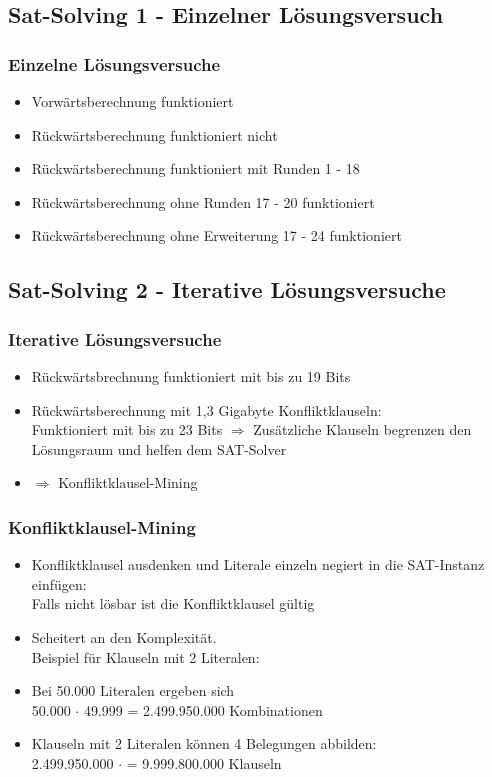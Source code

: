 \documentclass{beamer}
\begin{document}
  \subsection{Sat-Solving 1 - Einzelner Lösungsversuch}
    \begin{frame}
      \frametitle{Einzelne Lösungsversuche}
      \begin{itemize}
        \setlength{\itemsep}{20pt}
        \item Vorwärtsberechnung funktioniert
        \pause
        \item Rückwärtsberechnung funktioniert nicht
        \pause
        \item Rückwärtsberechnung funktioniert mit Runden 1 - 18
        \pause
        \item Rückwärtsberechnung ohne Runden 17 - 20 funktioniert
        \pause
        \item Rückwärtsberechnung ohne Erweiterung 17 - 24 funktioniert
      \end{itemize}
    \end{frame}
  \subsection{Sat-Solving 2 - Iterative Lösungsversuche}
    \begin{frame}
      \frametitle{Iterative Lösungsversuche}
      \begin{itemize}
        \setlength{\itemsep}{20pt}
        \item Rückwärtsbrechnung funktioniert mit bis zu 19 Bits
        \pause
        \item Rückwärtsberechnung mit 1,3 Gigabyte Konfliktklauseln:\\ Funktioniert mit bis zu 23 Bits
        \pause
        $ \Rightarrow $ Zusätzliche Klauseln begrenzen den Lösungsraum und helfen dem SAT-Solver
        \pause
        \item $ \Rightarrow $ Konfliktklausel-Mining
      \end{itemize}
    \end{frame}
    \begin{frame}
      \frametitle{Konfliktklausel-Mining}
      \begin{itemize}
       \item Konfliktklausel ausdenken und Literale einzeln negiert in die SAT-Instanz einfügen:\\Falls nicht lösbar ist die Konfliktklausel gültig
       \item Scheitert an den Komplexität.\\ \pause Beispiel für Klauseln mit 2 Literalen:
       \item Bei 50.000 Literalen ergeben sich\\ 50.000 $ \cdot $ 49.999 = 2.499.950.000 Kombinationen
       \item Klauseln mit 2 Literalen können 4 Belegungen abbilden:\\ 2.499.950.000 $ \cdot $ = 9.999.800.000 Klauseln
      \end{itemize}
    \end{frame}
\end{document}

